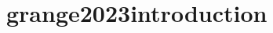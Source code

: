 \documentclass[
	11pt, %
	fleqn, %
	a4paper, %
]{LegrandOrangeBook}
\begin{document}
\chapter{grange2023introduction}








% 

% 

% 

% 

% 
\end{document}
